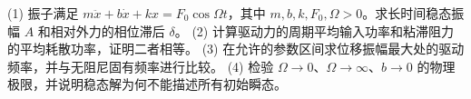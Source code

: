 (1) 振子满足 \(m\ddot x+b\dot x+kx=F_0\cos\Omega t\)，其中 \(m,b,k,F_0,\Omega>0\)。求长时间稳态振幅 \(A\) 和相对外力的相位滞后 \(\delta\)。
(2) 计算驱动力的周期平均输入功率和粘滞阻力的平均耗散功率，证明二者相等。
(3) 在允许的参数区间求位移振幅最大处的驱动频率，并与无阻尼固有频率进行比较。
(4) 检验 \(\Omega\to0\)、\(\Omega\to\infty\)、\(b\to0\) 的物理极限，并说明稳态解为何不能描述所有初始瞬态。
